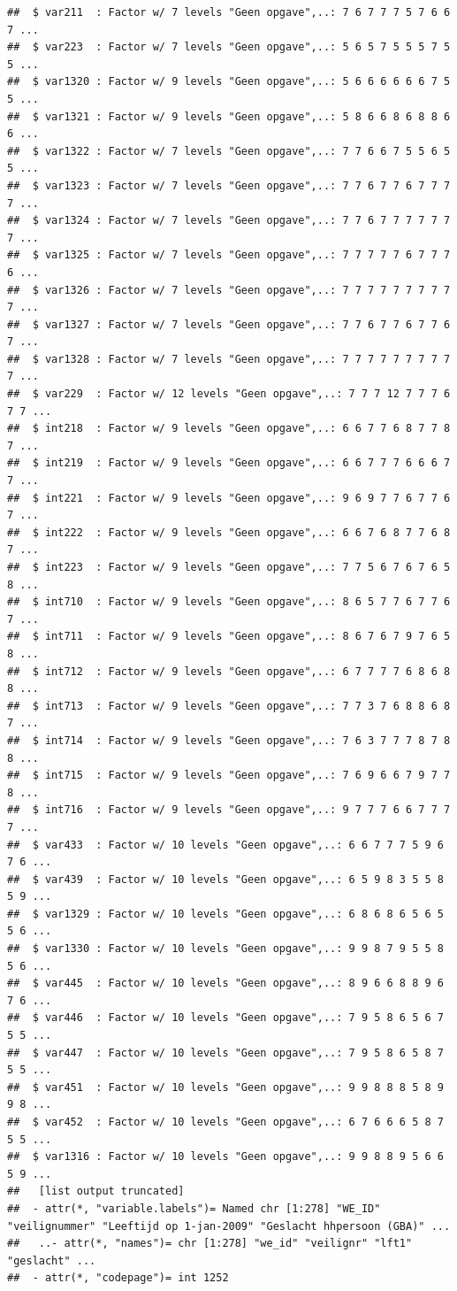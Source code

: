 \documentclass[
]{book}
\begin{document}
\begin{verbatim}
##  $ var211  : Factor w/ 7 levels "Geen opgave",..: 7 6 7 7 7 5 7 6 6 7 ...
##  $ var223  : Factor w/ 7 levels "Geen opgave",..: 5 6 5 7 5 5 5 7 5 5 ...
##  $ var1320 : Factor w/ 9 levels "Geen opgave",..: 5 6 6 6 6 6 6 7 5 5 ...
##  $ var1321 : Factor w/ 9 levels "Geen opgave",..: 5 8 6 6 8 6 8 8 6 6 ...
##  $ var1322 : Factor w/ 7 levels "Geen opgave",..: 7 7 6 6 7 5 5 6 5 5 ...
##  $ var1323 : Factor w/ 7 levels "Geen opgave",..: 7 7 6 7 7 6 7 7 7 7 ...
##  $ var1324 : Factor w/ 7 levels "Geen opgave",..: 7 7 6 7 7 7 7 7 7 7 ...
##  $ var1325 : Factor w/ 7 levels "Geen opgave",..: 7 7 7 7 7 6 7 7 7 6 ...
##  $ var1326 : Factor w/ 7 levels "Geen opgave",..: 7 7 7 7 7 7 7 7 7 7 ...
##  $ var1327 : Factor w/ 7 levels "Geen opgave",..: 7 7 6 7 7 6 7 7 6 7 ...
##  $ var1328 : Factor w/ 7 levels "Geen opgave",..: 7 7 7 7 7 7 7 7 7 7 ...
##  $ var229  : Factor w/ 12 levels "Geen opgave",..: 7 7 7 12 7 7 7 6 7 7 ...
##  $ int218  : Factor w/ 9 levels "Geen opgave",..: 6 6 7 7 6 8 7 7 8 7 ...
##  $ int219  : Factor w/ 9 levels "Geen opgave",..: 6 6 7 7 7 6 6 6 7 7 ...
##  $ int221  : Factor w/ 9 levels "Geen opgave",..: 9 6 9 7 7 6 7 7 6 7 ...
##  $ int222  : Factor w/ 9 levels "Geen opgave",..: 6 6 7 6 8 7 7 6 8 7 ...
##  $ int223  : Factor w/ 9 levels "Geen opgave",..: 7 7 5 6 7 6 7 6 5 8 ...
##  $ int710  : Factor w/ 9 levels "Geen opgave",..: 8 6 5 7 7 6 7 7 6 7 ...
##  $ int711  : Factor w/ 9 levels "Geen opgave",..: 8 6 7 6 7 9 7 6 5 8 ...
##  $ int712  : Factor w/ 9 levels "Geen opgave",..: 6 7 7 7 7 6 8 6 8 8 ...
##  $ int713  : Factor w/ 9 levels "Geen opgave",..: 7 7 3 7 6 8 8 6 8 7 ...
##  $ int714  : Factor w/ 9 levels "Geen opgave",..: 7 6 3 7 7 7 8 7 8 8 ...
##  $ int715  : Factor w/ 9 levels "Geen opgave",..: 7 6 9 6 6 7 9 7 7 8 ...
##  $ int716  : Factor w/ 9 levels "Geen opgave",..: 9 7 7 7 6 6 7 7 7 7 ...
##  $ var433  : Factor w/ 10 levels "Geen opgave",..: 6 6 7 7 7 5 9 6 7 6 ...
##  $ var439  : Factor w/ 10 levels "Geen opgave",..: 6 5 9 8 3 5 5 8 5 9 ...
##  $ var1329 : Factor w/ 10 levels "Geen opgave",..: 6 8 6 8 6 5 6 5 5 6 ...
##  $ var1330 : Factor w/ 10 levels "Geen opgave",..: 9 9 8 7 9 5 5 8 5 6 ...
##  $ var445  : Factor w/ 10 levels "Geen opgave",..: 8 9 6 6 8 8 9 6 7 6 ...
##  $ var446  : Factor w/ 10 levels "Geen opgave",..: 7 9 5 8 6 5 6 7 5 5 ...
##  $ var447  : Factor w/ 10 levels "Geen opgave",..: 7 9 5 8 6 5 8 7 5 5 ...
##  $ var451  : Factor w/ 10 levels "Geen opgave",..: 9 9 8 8 8 5 8 9 9 8 ...
##  $ var452  : Factor w/ 10 levels "Geen opgave",..: 6 7 6 6 6 5 8 7 5 5 ...
##  $ var1316 : Factor w/ 10 levels "Geen opgave",..: 9 9 8 8 9 5 6 6 5 9 ...
##   [list output truncated]
##  - attr(*, "variable.labels")= Named chr [1:278] "WE_ID" "veilignummer" "Leeftijd op 1-jan-2009" "Geslacht hhpersoon (GBA)" ...
##   ..- attr(*, "names")= chr [1:278] "we_id" "veilignr" "lft1" "geslacht" ...
##  - attr(*, "codepage")= int 1252
\end{verbatim}
\end{document}
